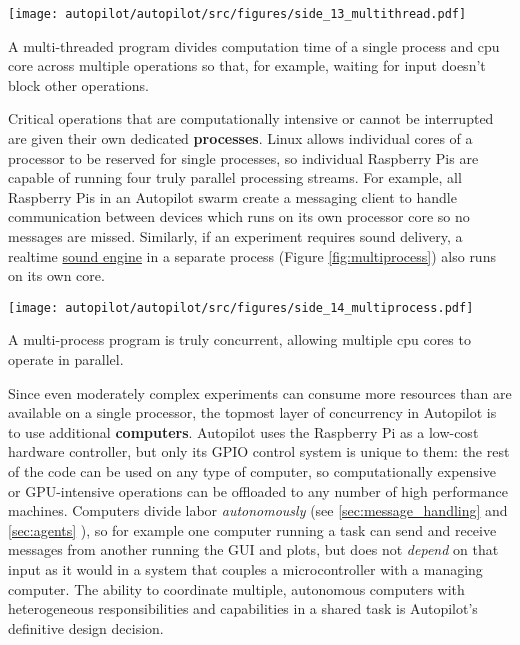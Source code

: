 \begin{marginfigure}[0.25cm]
\texttt{[image: autopilot/autopilot/src/figures/side\_13\_multithread.pdf]}
\caption{A multi-threaded program divides computation time of a single process and cpu core across multiple operations so that, for example, waiting for input doesn't block other operations.}
\label{fig:multithread}
\end{marginfigure}

Critical operations that are computationally intensive or cannot be interrupted are given their own dedicated \textbf{processes}. Linux allows individual cores of a processor to be reserved for single processes, so individual Raspberry Pis are capable of running four truly parallel processing streams. For example, all Raspberry Pis in an Autopilot swarm create a messaging client to handle communication between devices which runs on its own processor core so no messages are missed. Similarly, if an experiment requires sound delivery, a realtime \hyperref[sec:stim]{sound engine} in a separate process (Figure \ref{fig:multiprocess}) also runs on its own core.

\begin{marginfigure}[0.1cm]
 \texttt{[image: autopilot/autopilot/src/figures/side\_14\_multiprocess.pdf]}
 \caption{A multi-process program is truly concurrent, allowing multiple cpu cores to operate in parallel.}
 \label{fig:multiprocess}
\end{marginfigure}

Since even moderately complex experiments can consume more resources than are available on a single processor, the topmost layer of concurrency in Autopilot is to use additional \textbf{computers}. Autopilot uses the Raspberry Pi as a low-cost hardware controller, but only its GPIO control system is unique to them: the rest of the code can be used on any type of computer, so computationally expensive or GPU-intensive operations can be offloaded to any number of high performance machines. Computers divide labor \textit{autonomously} (see \ref{sec:message_handling} and \ref{sec:agents} ), so for example one computer running a task can send and receive messages from another running the GUI and plots, but does not \textit{depend} on that input as it would in a system that couples a microcontroller with a managing computer. The ability to coordinate multiple, autonomous computers with heterogeneous responsibilities and capabilities in a shared task is Autopilot's definitive design decision.



